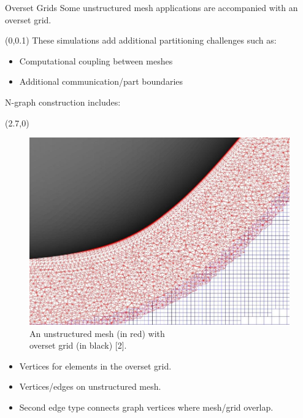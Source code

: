 \documentclass{beamer}
\begin{document}
\begin{textblock}{15.6}
\begin{textblock}{5.2}
\begin{block}{\centering Overset Grids}
      Some unstructured mesh applications are accompanied with an overset grid.
      \begin{textblock}{3}(0,0.1)
        These simulations add additional partitioning challenges such as:
        \begin{itemize}
        \item Computational coupling between meshes
        \item Additional communication/part boundaries
        \end{itemize}
        N-graph construction includes:

      \end{textblock}
      \begin{textblock}{2.5}(2.7,0)
        \begin{figure}
          \centering
          \includegraphics[height=.5\textwidth]{../figures/overset_grid.jpg}
          \caption{An unstructured mesh (in red) with \\overset grid (in black) [2].}
        \end{figure}
      \end{textblock}
      \vspace{9.1cm}

      
      \begin{itemize}
      \item Vertices for elements in the overset grid.
      \item Vertices/edges on unstructured mesh.
      \item Second edge type connects graph vertices where mesh/grid overlap.
      \end{itemize}
      
    \end{block}
    

\end{textblock}
\end{textblock}
\end{document}
